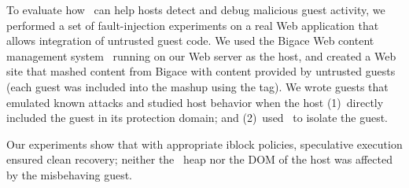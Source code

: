 \label{section:evaluation:recovery}
%
To evaluate how \txjs\ can help hosts detect and debug malicious guest
activity, we performed a set of fault-injection experiments on a real Web
application that allows integration of untrusted guest code. We used the Bigace
Web content management system~\cite{bigace} running on our Web server as the
host, and created a Web site that mashed content from Bigace with content
provided by untrusted guests (each guest was included into the mashup using the
 tag).  We wrote guests that emulated known attacks and studied
host behavior when the host (1)~directly included the guest in its protection
domain; and (2)~used \txjs\ to isolate the guest.

Our experiments show that with appropriate iblock policies, speculative
execution ensured clean recovery; neither the \js\ heap nor the DOM of the host
was affected by the misbehaving guest.


